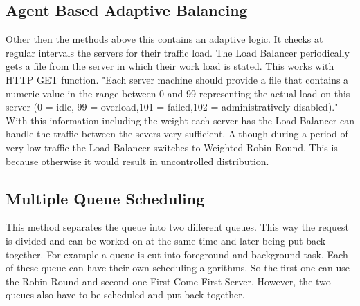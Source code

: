 \documentclass[12p]{article}
\begin{document}
	\subsection{Agent Based Adaptive Balancing}
	Other then the methods above this contains an adaptive logic. It checks at regular intervals the servers for their traffic load. The Load Balancer periodically gets a file from the server in which their work load is stated. This works with HTTP GET function. "Each server machine should  provide a file that contains a numeric value in the range between 0 and 99 representing the  actual load on this server (0 = idle, 99 = overload,101 = failed,102 = administratively disabled)."\cite{schedu} With this information  including the weight each server has the Load Balancer can handle the traffic between the severs very sufficient. Although during a period of very low traffic the Load Balancer switches to Weighted Robin Round. This is because otherwise it would result in uncontrolled distribution.
	
	\subsection{Multiple Queue Scheduling}
	This method separates the queue into two different queues. This way the request is divided and can be worked on at the same time and later being put back together. For example a queue is cut into foreground and background task. Each of these queue can have their own scheduling algorithms. So the first one can use the Robin Round and second one First Come First Server. However, the two queues also have to be scheduled and put back together. 
	
	
	
\end{document}
